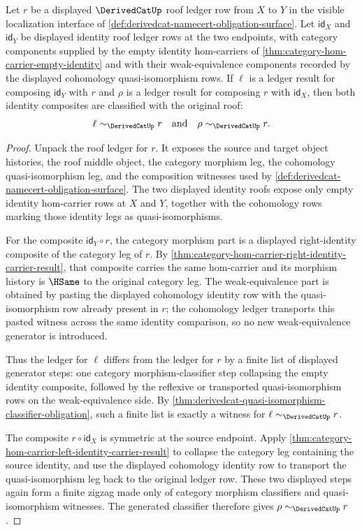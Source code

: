 \begin{theorem}
\label{thm:derivedcat-roof-identity-unit-laws}
Let $r$ be a displayed $\DerivedCatUp$ roof ledger row from $X$ to $Y$ in the visible localization interface of \autoref{def:derivedcat-namecert-obligation-surface}. Let $\mathsf{id}_X$ and $\mathsf{id}_Y$ be displayed identity roof ledger rows at the two endpoints, with category components supplied by the empty identity hom-carriers of \autoref{thm:category-hom-carrier-empty-identity} and with their weak-equivalence components recorded by the displayed cohomology quasi-isomorphism rows. If $\ell$ is a ledger result for composing $\mathsf{id}_Y$ with $r$ and $\rho$ is a ledger result for composing $r$ with $\mathsf{id}_X$, then both identity composites are classified with the original roof:
$$
\ell\sim_{\DerivedCatUp} r
\quad\text{and}\quad
\rho\sim_{\DerivedCatUp} r.
$$
\end{theorem}
\begin{proof}
Unpack the roof ledger for $r$. It exposes the source and target object histories, the roof middle object, the category morphism leg, the cohomology quasi-isomorphism leg, and the composition witnesses used by \autoref{def:derivedcat-namecert-obligation-surface}. The two displayed identity roofs expose only empty identity hom-carrier rows at $X$ and $Y$, together with the cohomology rows marking those identity legs as quasi-isomorphisms.

For the composite $\mathsf{id}_Y\circ r$, the category morphism part is a displayed right-identity composite of the category leg of $r$. By \autoref{thm:category-hom-carrier-right-identity-carrier-result}, that composite carries the same hom-carrier and its morphism history is $\HSame$ to the original category leg. The weak-equivalence part is obtained by pasting the displayed cohomology identity row with the quasi-isomorphism row already present in $r$; the cohomology ledger transports this pasted witness across the same identity comparison, so no new weak-equivalence generator is introduced.

Thus the ledger for $\ell$ differs from the ledger for $r$ by a finite list of displayed generator steps: one category morphism-classifier step collapsing the empty identity composite, followed by the reflexive or transported quasi-isomorphism rows on the weak-equivalence side. By \autoref{thm:derivedcat-quasi-isomorphism-classifier-obligation}, such a finite list is exactly a witness for $\ell\sim_{\DerivedCatUp} r$.

The composite $r\circ\mathsf{id}_X$ is symmetric at the source endpoint. Apply \autoref{thm:category-hom-carrier-left-identity-carrier-result} to collapse the category leg containing the source identity, and use the displayed cohomology identity row to transport the quasi-isomorphism leg back to the original ledger row. These two displayed steps again form a finite zigzag made only of category morphism classifiers and quasi-isomorphism witnesses. The generated classifier therefore gives $\rho\sim_{\DerivedCatUp} r$.
\end{proof}

